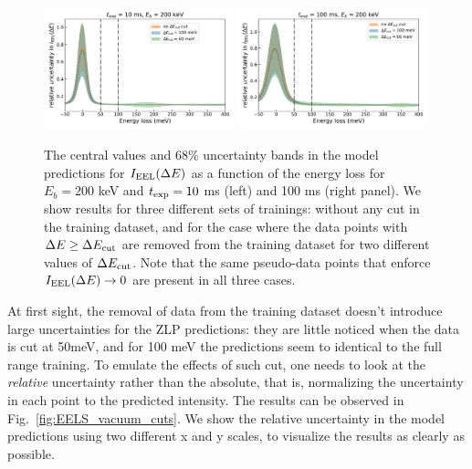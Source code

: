 \begin{figure}[H]
    \centering
    \includegraphics[width=0.49\textwidth]{plots/prediction_with_cut_10ms_absolute.pdf}
    \includegraphics[width=0.49\textwidth]{plots/prediction_with_cut_100ms_absolute.pdf}
    \caption{The central values and 68\% uncertainty bands 
    in the model predictions for $I_{\rm EEL}(\Delta E)$
      as a function of the energy loss for $E_b=200$ keV and $t_{\rm exp}=10$ ms (left)
      and 100 ms (right panel).
      We show results for three different sets of trainings: without any cut
      in the training dataset, and for the case where the data points with $\Delta E \ge \Delta E_{\rm cut}$
      are removed from the training dataset for two different values
      of $\Delta E_{\rm cut}$.
      Note that the same pseudo-data points that enforce $I_{\rm EEL}(\Delta E)\to 0$ are present
      in all three cases.
      }
      \label{fig:EELS_vacuum_DeltaE_abs}
\end{figure}


At first sight, the removal of data from the training dataset doesn't introduce large
uncertainties for the ZLP predictions: they are little noticed when the data is cut at 50meV,
and for 100 meV the predictions seem to identical to the full range training.
%
To emulate the effects of such cut, one needs to look at the {\it relative} uncertainty rather
than the absolute, that is, normalizing the uncertainty in each point to the predicted intensity.
%
The results can be observed in Fig.~\ref{fig:EELS_vacuum_cuts}. We show the relative uncertainty
in the model predictions using two different x and y scales, to visualize the results
as clearly as possible.


